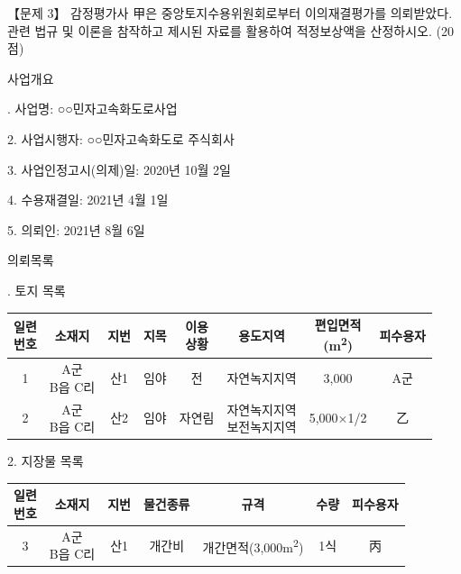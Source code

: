 \begin{longquestion}{【문제 3】}
감정평가사 甲은 중앙토지수용위원회로부터 이의재결평가를 의뢰받았다. 관련 법규 및 이론을 참작하고 제시된 자료를 활용하여 적정보상액을 산정하시오. (20점) \par
\medskip{} 사업개요 \par
\medskip{}. 사업명: ○○민자고속화도로사업 \par
2. 사업시행자: ○○민자고속화도로 주식회사 \par
3. 사업인정고시(의제)일: 2020년 10월 2일 \par
4. 수용재결일: 2021년 4월 1일 \par
5. 의뢰인: 2021년 8월 6일 \par
\medskip{} 의뢰목록 \par
\medskip{}. 토지 목록 \par
{\small\centering
\begin{tabular}{|c|c|c|c|c|c|c|c|}\hline
\makecell{일련\\번호} & 소재지 & 지번 & 지목 & \makecell{이용\\상황} & 용도지역 & \makecell{편입면적\\(m\textsuperscript{2})} & 피수용자 \\\hline
1 & \makecell{A군\\B읍 C리} & 산1 & 임야 & 전 & 자연녹지지역 & 3,000 & A군 \\\hline
2 & \makecell{A군\\B읍 C리} & 산2 & 임야 & 자연림 & \makecell{자연녹지지역\\보전녹지지역} & 5,000×1/2 & 乙 \\\hline
\end{tabular}\par}
2. 지장물 목록 \par
{\small\centering
\begin{tabular}{|c|c|c|c|c|c|c|}\hline
\makecell{일련\\번호} & 소재지 & 지번 & 물건종류 & 규격 & 수량 & 피수용자 \\\hline
3 & \makecell{A군\\B읍 C리} & 산1 & 개간비 & 개간면적(3,000m\textsuperscript{2}) & 1식 & 丙 \\\hline

\end{tabular}}
\end{longquestion}
